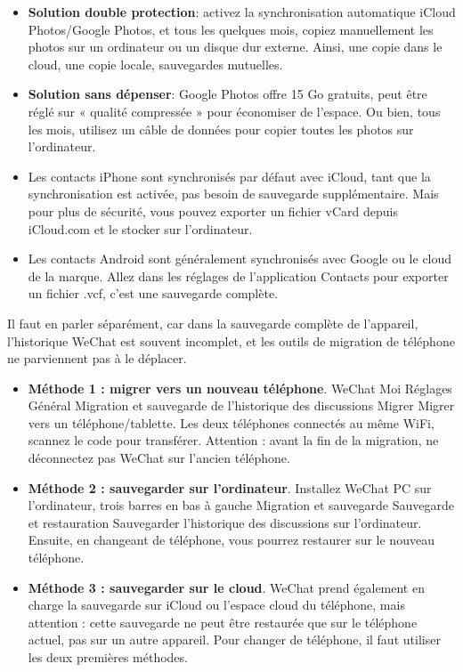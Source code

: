 
\begin{itemize}
  \item \textbf{Solution double protection}: activez la synchronisation automatique iCloud Photos/Google Photos, et tous les quelques mois, copiez manuellement les photos sur un ordinateur ou un disque dur externe. Ainsi, une copie dans le cloud, une copie locale, sauvegardes mutuelles.
  \item \textbf{Solution sans dépenser}: Google Photos offre 15 Go gratuits, peut être réglé sur « qualité compressée » pour économiser de l'espace. Ou bien, tous les mois, utilisez un câble de données pour copier toutes les photos sur l'ordinateur.
\end{itemize}


\begin{itemize}
  \item Les contacts iPhone sont synchronisés par défaut avec iCloud, tant que la synchronisation est activée, pas besoin de sauvegarde supplémentaire. Mais pour plus de sécurité, vous pouvez exporter un fichier vCard depuis iCloud.com et le stocker sur l'ordinateur.
  \item Les contacts Android sont généralement synchronisés avec Google ou le cloud de la marque. Allez dans les réglages de l'application Contacts pour exporter un fichier .vcf, c'est une sauvegarde complète.
\end{itemize}


Il faut en parler séparément, car dans la sauvegarde complète de l'appareil, l'historique WeChat est souvent incomplet, et les outils de migration de téléphone ne parviennent pas à le déplacer.

\begin{itemize}
  \item \textbf{Méthode 1 : migrer vers un nouveau téléphone}. WeChat Moi Réglages Général Migration et sauvegarde de l'historique des discussions Migrer Migrer vers un téléphone/tablette. Les deux téléphones connectés au même WiFi, scannez le code pour transférer. Attention : avant la fin de la migration, ne déconnectez pas WeChat sur l'ancien téléphone.
  \item \textbf{Méthode 2 : sauvegarder sur l'ordinateur}. Installez WeChat PC sur l'ordinateur, trois barres en bas à gauche Migration et sauvegarde Sauvegarde et restauration Sauvegarder l'historique des discussions sur l'ordinateur. Ensuite, en changeant de téléphone, vous pourrez restaurer sur le nouveau téléphone.
  \item \textbf{Méthode 3 : sauvegarder sur le cloud}. WeChat prend également en charge la sauvegarde sur iCloud ou l'espace cloud du téléphone, mais attention : cette sauvegarde ne peut être restaurée que sur le téléphone actuel, pas sur un autre appareil. Pour changer de téléphone, il faut utiliser les deux premières méthodes.
\end{itemize}

